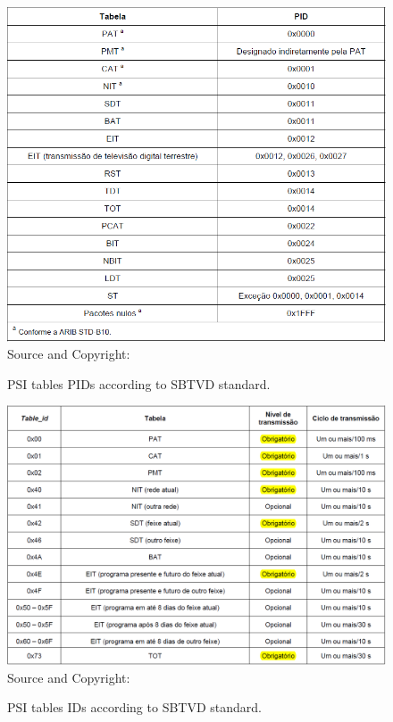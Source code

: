 \documentclass[
	12pt,				%
	openright,			%
	twoside,			%
	a4paper,			%
	brazil,
	french,				%
	english
	]{abntex2}
\begin{document}
\begin{anexosenv}
\begin{figure}[!hb]
\centering
\caption{PSI tables PIDs according to SBTVD standard.}
\includegraphics[width=0.7\linewidth]{figuras/tab_psi_tables_names_pids_abnt.png}
\\Source and Copyright: 
\label{fig:tab_psi_tables_names_pids_abnt}
\end{figure}

\begin{figure}[!hb]
\centering
\caption{PSI tables IDs according to SBTVD standard.}
\includegraphics[width=0.7\linewidth]{figuras/tab_psi_tables_ids_level_frequency_abnt.png}
\\Source and Copyright: 
\label{fig:tab_psi_tables_ids_level_frequency}
\end{figure}



\end{anexosenv}

\printindex
\end{document}
